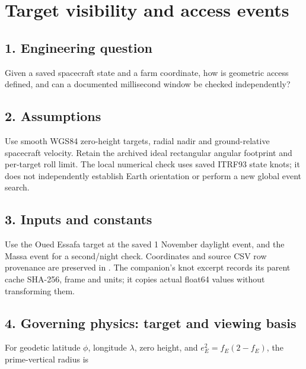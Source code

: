 \documentclass[10pt,a4paper]{article}
\numberwithin{equation}{section}
\begin{document}
\clearpage\section{Target visibility and access events}\label{ch:7}

\subsection*{1. Engineering question}
\begin{sloppypar}Given a saved spacecraft state and a farm coordinate, how is geometric access defined, and can a documented millisecond window be checked independently?\end{sloppypar}


\subsection*{2. Assumptions}
\begin{sloppypar}Use smooth WGS84 zero-height targets, radial nadir and ground-relative spacecraft velocity. Retain the archived ideal rectangular angular footprint and per-target roll limit. The local numerical check uses saved ITRF93 state knots; it does not independently establish Earth orientation or perform a new global event search.\end{sloppypar}


\subsection*{3. Inputs and constants}
\begin{sloppypar}Use the Oued Essafa target at the saved 1 November daylight event, and the Massa event for a second/night check. Coordinates and source CSV row provenance are preserved in \cite{S09}. The companion's knot excerpt records its parent cache SHA-256, frame and units; it copies actual float64 values without transforming them.\end{sloppypar}


\subsection*{4. Governing physics: target and viewing basis}

\begin{sloppypar}For geodetic latitude \(\phi\), longitude \(\lambda\), zero height, and \(e_E^2=f_E(2-f_E)\), the prime-vertical radius is\end{sloppypar}
\end{document}
